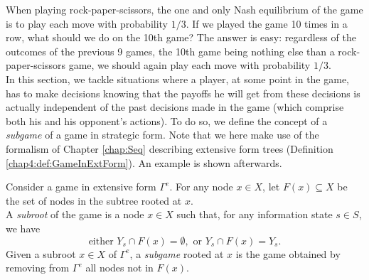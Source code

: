 When playing rock-paper-scissors, the one and only Nash equilibrium of the game is to play each move with probability $1/3$. If we played the game 10 times in a row, what should we do on the 10th game?
The answer is easy: regardless of the outcomes of the previous 9 games, the 10th game being nothing else than a rock-paper-scissors game, we should again play each move with probability $1/3$.\\
In this section, we tackle situations where a player, at some point in the game, has to make decisions knowing that the payoffs he will get from these decisions is actually independent of the past decisions made in the game (which comprise both his and his opponent's actions).
To do so, we define the concept of a \emph{subgame} of a game in strategic form. Note that we here make use of the formalism of Chapter \ref{chap:Seq} describing extensive form trees (Definition \ref{chap4:def:GameInExtForm}). An example is shown afterwards.
\begin{definition}
Consider a game in extensive form $\Gamma^e$.
For any node $x \in X$, let $F(x) \subseteq X$ be the set of nodes in the subtree rooted at $x$. \\
A \emph{subroot} of the game is a node $x \in X$ such that, for any information state $s \in S$, we have
$$\text{either } Y_s \cap F(x) = \emptyset, \text{ or } Y_s \cap F(x) = Y_s.$$
Given a subroot $x \in X$ of $\Gamma^e$, a \emph{subgame} rooted at $x$ is the game obtained by removing from $\Gamma^e$ all nodes not in $F(x)$.
\end{definition}


